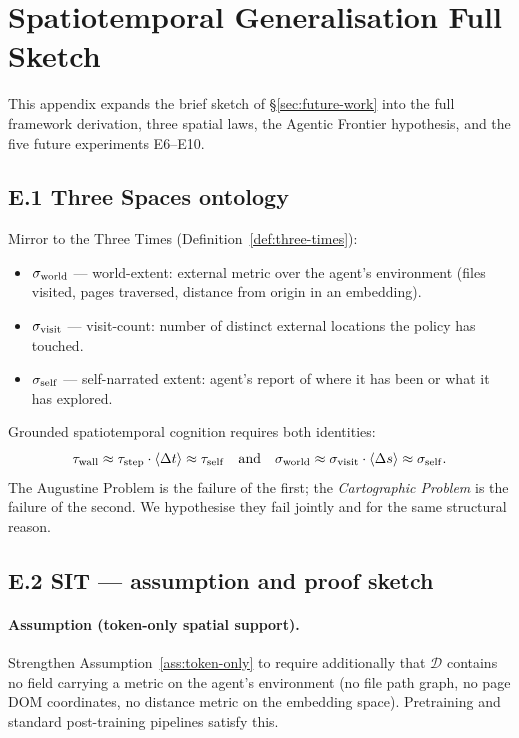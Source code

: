 
\section{Spatiotemporal Generalisation Full Sketch}
\label{app:spatiotemporal}

This appendix expands the brief sketch of \S\ref{sec:future-work} into the full framework derivation, three spatial laws, the Agentic Frontier hypothesis, and the five future experiments E6--E10.

\subsection*{E.1 Three Spaces ontology}

Mirror to the Three Times (Definition~\ref{def:three-times}):

\begin{itemize}[leftmargin=*]
    \item $\sigma_{\mathrm{world}}$ --- world-extent: external metric over the agent's environment (files visited, pages traversed, distance from origin in an embedding).
    \item $\sigma_{\mathrm{visit}}$ --- visit-count: number of distinct external locations the policy has touched.
    \item $\sigma_{\mathrm{self}}$ --- self-narrated extent: agent's report of where it has been or what it has explored.
\end{itemize}

Grounded spatiotemporal cognition requires both identities:
\[
\tau_{\mathrm{wall}} \approx \tau_{\mathrm{step}} \cdot \langle\Delta t\rangle \approx \tau_{\mathrm{self}} \quad \text{and} \quad \sigma_{\mathrm{world}} \approx \sigma_{\mathrm{visit}} \cdot \langle\Delta s\rangle \approx \sigma_{\mathrm{self}}.
\]
The Augustine Problem is the failure of the first; the \emph{Cartographic Problem} is the failure of the second. We hypothesise they fail jointly and for the same structural reason.

\subsection*{E.2 SIT --- assumption and proof sketch}

\paragraph{Assumption (token-only spatial support).}
\label{ass:token-only-spatial}
Strengthen Assumption~\ref{ass:token-only} to require additionally that $\mathcal{D}$ contains no field carrying a metric on the agent's environment (no file path graph, no page DOM coordinates, no distance metric on the embedding space). Pretraining and standard post-training pipelines satisfy this.

